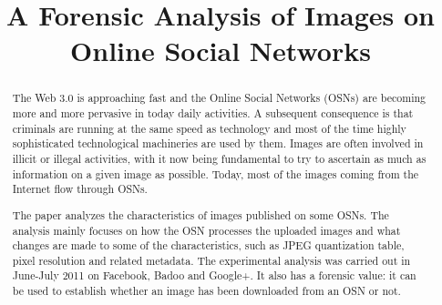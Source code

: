 \documentclass[10pt, conference]{IEEEtran}
\begin{document}
\title{A Forensic Analysis of Images on\\Online Social Networks}


\author{

}

\maketitle



\begin{abstract}
The Web 3.0 is approaching fast and the Online Social Networks (OSNs) are becoming more and more pervasive in today daily activities. A subsequent consequence is that criminals are running at the same speed as technology and most of the time highly sophisticated technological machineries are used by them. Images are often involved in illicit or illegal activities, with it now being fundamental to try to ascertain as much as information on a given image as possible. Today, most of the images coming from the Internet flow through OSNs.

The paper analyzes the characteristics of images  published on some OSNs. The analysis mainly focuses on how the OSN processes the uploaded images and what changes are made to some of the characteristics, such as JPEG quantization table, pixel resolution and related metadata.  The experimental analysis was carried out in June-July 2011 on Facebook, Badoo and Google+. It also has a forensic value: it can be used to establish whether an image has been downloaded from an OSN or not.
\end{abstract}
\end{document}
